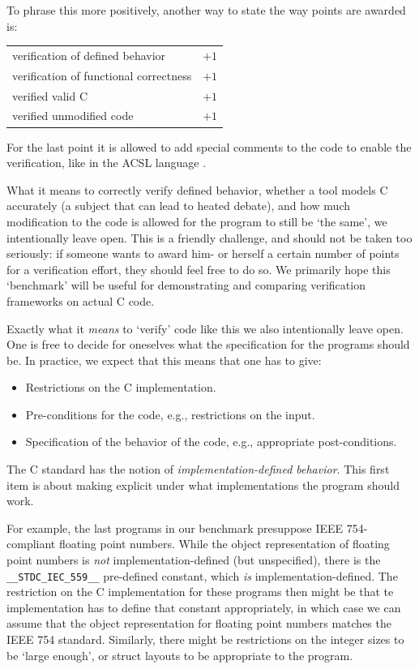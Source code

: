 \documentclass{article}
\begin{document}
To phrase this more positively, another way to state the way points are awarded is:
\begin{center}
\begin{tabular}{ll}
verification of defined behavior & $+1$ \\
verification of functional correctness & $+1$ \\
verified valid C & $+1$ \\
verified unmodified code & $+1$
\end{tabular}
\end{center}
For the last point it is allowed to add special comments to
the code to enable the verification, like in the ACSL language \cite{bau:cuo:fil:mar:mon:moy:pre:16}.

What it means to correctly verify defined behavior, whether a tool
models C accurately (a subject that can lead to heated debate), and how much modification to the code is allowed
for the program to still be `the same', we intentionally leave open.
This is a friendly challenge, and should not be taken too seriously:
if someone wants to award him- or herself a certain number of points
for a verification effort, they should feel free to do so.
We primarily hope this `benchmark' will be useful for demonstrating and comparing verification frameworks on actual C code.

Exactly what it \emph{means} to `verify' code like this we also intentionally
leave open.
One is free to decide for oneselves what the specification for the programs should be.
In practice, we expect that this means that one has to give:
\begin{itemize}
\item
Restrictions on the C implementation.
\item
Pre-conditions for the code, e.g., restrictions on the input.
\item
Specification of the behavior of the code, e.g., appropriate post-conditions.
\end{itemize}
The C standard \cite{iso:11} has the notion of \emph{implementation-defined
behavior}.
This first item is about making
explicit under what implementations the program should work.

For example, the last programs in our benchmark presuppose IEEE 754-compliant
floating point numbers.
While the object representation of floating point numbers is \emph{not} im\-ple\-men\-ta\-tion-defined (but unspecified),
there is the \lstinline|__STDC_IEC_559__| pre-defined constant, which \emph{is} implementation-defined.
The restriction on the C implementation for these programs then might be that
te implementation has to define that constant appropriately,
in which case we can assume that the object representation for floating point numbers matches the IEEE 754 standard.
Similarly, there might be restrictions on the integer sizes to be `large enough', or struct layouts to be appropriate to the program.
\end{document}
